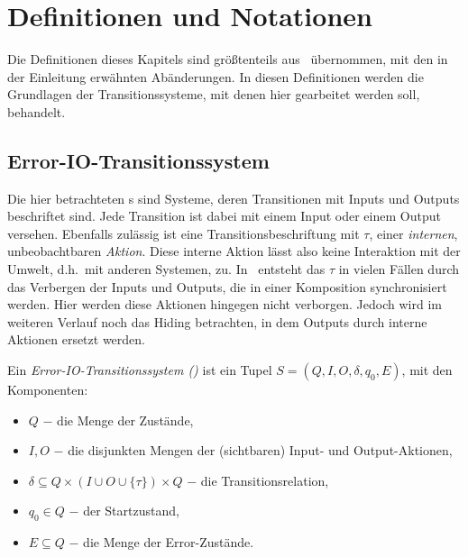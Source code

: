 \chapter{Definitionen und Notationen}

Die Definitionen dieses Kapitels sind größtenteils aus~\cite{Vogler2014EIO}
übernommen, mit den in der Einleitung erwähnten Abänderungen. In diesen
Definitionen werden die Grundlagen der Transitionssysteme, mit denen hier
gearbeitet werden soll, behandelt.

\section{Error-IO-Transitionssystem}
Die hier betrachteten \EIO{}s sind Systeme, deren Transitionen mit Inputs und
Outputs beschriftet sind. Jede Transition ist dabei mit einem Input oder einem
Output versehen. Ebenfalls zulässig ist eine Transitionsbeschriftung mit
$\tau$, einer \emph{internen}, unbeobachtbaren \emph{Aktion}. Diese interne
Aktion lässt also keine Interaktion mit der Umwelt, d.h.\ mit anderen Systemen,
zu. In~\cite{Vogler2014EIO} entsteht das $\tau$ in vielen Fällen durch das
Verbergen der Inputs und Outputs, die in einer Komposition synchronisiert
werden. Hier werden diese Aktionen hingegen nicht verborgen. Jedoch wird im
weiteren Verlauf noch das Hiding betrachten, in dem Outputs durch interne
Aktionen ersetzt werden.

\begin{Def}
  Ein \emph{Error-IO-Transitionssystem \linebreak (\EIO{})} ist
  ein Tupel $S=(Q,I,O,\delta, q_0, E)$, mit den Komponenten:
  \begin{itemize}
    \item $Q$ $-$ die Menge der Zustände,
    \item $I,O$ $-$ die disjunkten Mengen der (sichtbaren) Input- und
      Output-Aktionen,
    \item $\delta\subseteq Q\times \left(I\cup O\cup\{\tau\}\right)\times Q$ $-$ die
      Transitionsrelation,
    \item $q_0\in Q$ $-$ der Startzustand,
    \item $E\subseteq Q$ $-$ die Menge der Error-Zustände.
  \end{itemize}
\end{Def}

